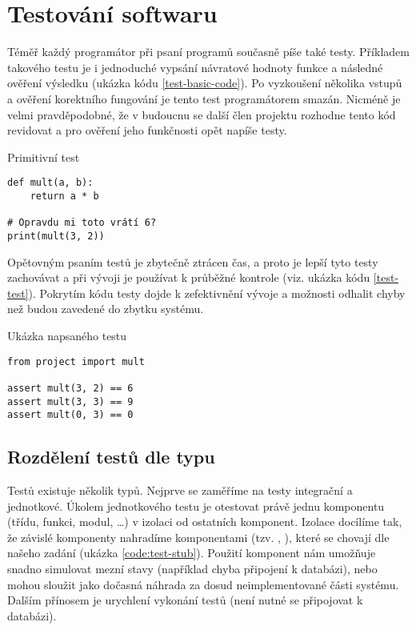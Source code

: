 \section{Testování softwaru}

Téměř každý programátor při psaní programů současně píše také testy.
Příkladem takového testu je i jednoduché vypsání návratové hodnoty funkce a následné ověření výsledku (ukázka kódu \ref{test-basic-code}).
Po vyzkoušení několika vstupů a ověření korektního fungování je tento test programátorem smazán.
Nicméně je velmi pravděpodobné, že v budoucnu se další člen projektu rozhodne tento kód revidovat a pro ověření jeho funkčnosti opět napíše testy.

\begin{listing}[ht]
\caption{\label{test-basic-code}Primitivní test}
\begin{verbatim}
def mult(a, b):
    return a * b

# Opravdu mi toto vrátí 6?
print(mult(3, 2))
\end{verbatim}
\end{listing}

Opětovným psaním testů je zbytečně ztrácen čas, a proto je lepší tyto testy zachovávat a při vývoji je používat k průběžné kontrole (viz. ukázka kódu \ref{test-test}).
Pokrytím kódu testy dojde k zefektivnění vývoje a možnosti odhalit chyby než budou zavedené do zbytku systému.

\begin{listing}[ht]
\caption{\label{test-test}Ukázka napsaného testu}
\begin{verbatim}
from project import mult

assert mult(3, 2) == 6
assert mult(3, 3) == 9
assert mult(0, 3) == 0
\end{verbatim}
\end{listing}

\subsection{Rozdělení testů dle typu}

Testů existuje několik typů.
Nejprve se zaměříme na testy integrační a jednotkové.
Úkolem jednotkového testu je otestovat právě jednu komponentu (třídu, funkci, modul, \ldots) v izolaci od ostatních komponent.
Izolace docílíme tak, že závislé komponenty nahradíme komponentami  (tzv. ,  \cite{fowler_mocks}), které se chovají  dle našeho zadání (ukázka \ref{code:test-stub}).
Použití  komponent nám umožňuje snadno simulovat mezní stavy (například chyba připojení k databázi), nebo mohou sloužit jako dočasná náhrada za dosud neimplementované části systému.
Dalším přínosem je urychlení vykonání testů (není nutné se připojovat k databázi).
\cite{zemek_integracni_x_jednotkove}

